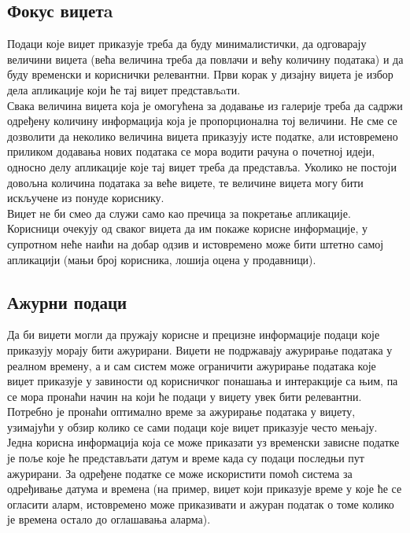 \documentclass[12pt,oneside]{memoir}
\begin{document}
\subsection{Фокус виџетa}
\indent  Подаци које виџет приказује треба да буду минималистички, да одговарају величини виџета (већа величина треба да повлачи и већу количину података) и да буду временски и кориснички релевантни. Први корак у дизајну виџета је избор дела апликације који ће тај виџет представљaти. 
\\
\indent Свака величина виџета која је омогућена за додавање из галерије треба да садржи одређену количину информација која је пропорционална тој величини. Не сме се дозволити да неколико величина виџета приказују исте податке, али истовремено приликом додавања нових података се мора водити рачуна о почетној идеји, односно делу апликације које тај виџет треба да представља. Уколико не постоји довољна количина података за веће виџете, те величине виџета могу бити искључене из понуде кориснику.
\\
\indent Виџет не би смео да служи само као пречица за покретање апликације. Корисници очекују од сваког виџета да им покаже корисне информације, у супротном неће наићи на добар одзив и истовремено може бити штетно самој апликацији (мањи број корисника, лошија оцена у продавници).

\subsection{Ажурни подаци}
\indent Да би виџети могли да пружају корисне и прецизне информације подаци које приказују морају бити ажурирани. Виџети не подржавају ажурирање података у реалном времену, а и сам систем може ограничити ажурирање података које виџет приказује у завиности од корисничког понашања и интеракције са њим, па се мора пронаћи начин на који ће подаци у виџету увек бити релевантни. 
\\
\indent Потребно је пронаћи оптимално време за ажурирање података у виџету, узимајући у обзир колико се сами подаци које виџет приказује често мењају. Једна корисна информација која се може приказати уз временски зависне податке је поље које ће представљати датум и време када су подаци последњи пут ажурирани. За одређене податке се може искористити помоћ система за одређивање датума и времена (на пример, виџет који приказује време у које ће се огласити аларм, истовремено може приказивати и ажуран податак о томе колико је времена остало до оглашавања аларма).
\end{document}

